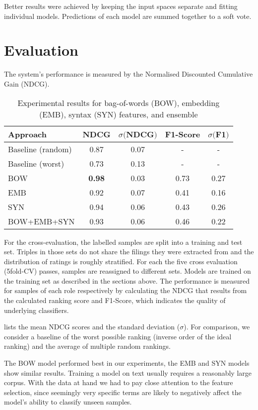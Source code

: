 Better results were achieved by keeping the input spaces separate and fitting individual models.
Predictions of each model are summed together to a soft vote.

\section{Evaluation}

The system's performance is measured by the Normalised Discounted Cumulative Gain (NDCG).%
\begin{table}[H]
	\caption{Experimental results for bag-of-words (BOW), embedding (EMB), syntax (SYN) features, and ensemble}
	\label{tab:results}
	\begin{tabular}{lcccc}
		\toprule
		Approach & NDCG & $\sigma ($NDCG$)$ & F1-Score &  $\sigma ($F1$)$\\
		\midrule
		Baseline (random) & 0.87 & 0.07 & - & - \\
		Baseline (worst)  & 0.73 & 0.13 & - & - \\
		\midrule
		BOW & \textbf{0.98} & 0.03 & 0.73 & 0.27\\
		EMB & 0.92 & 0.07 & 0.41 & 0.16\\
		SYN & 0.94 & 0.06 & 0.43 & 0.26 \\
		BOW+EMB+SYN& 0.93 & 0.06 & 0.46 & 0.22\\
		\bottomrule
	\end{tabular}
\end{table}
For the cross-evaluation, the labelled samples are split into a training and test set.
Triples in those sets do not share the filings they were extracted from and the distribution of ratings is roughly stratified.
For each the five cross evaluation (5fold-CV) passes, samples are reassigned to different sets.
Models are trained on the training set as described in the sections above.
The performance is measured for samples of each role respectively by calculating the NDCG that results from the calculated ranking score and F1-Score, which indicates the quality of underlying classifiers.

 lists the mean NDCG scores and the standard deviation ($\sigma$).
For comparison, we consider a baseline of the worst possible ranking (inverse order of the ideal ranking) and the average of multiple random rankings.

The BOW model performed best in our experiments, the EMB and SYN models show similar results. 
Training a model on text usually requires a reasonably large corpus.
With the data at hand we had to pay close attention to the feature selection, since seemingly very specific terms are likely to negatively affect the model's ability to classify unseen samples.


